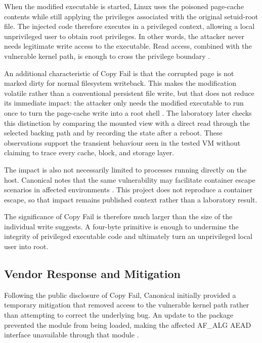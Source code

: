 When the modified executable is started, Linux uses the poisoned page-cache
contents while still applying the privileges associated with the original
setuid-root file. The injected code therefore executes in a privileged context,
allowing a local unprivileged user to obtain root privileges. In other words, the
attacker never needs legitimate write access to the executable. Read access,
combined with the vulnerable kernel path, is enough to cross the privilege
boundary \cite{copyfail-research}.

An additional characteristic of Copy Fail is that the corrupted page is not
marked dirty for normal filesystem writeback. This makes the modification
volatile rather than a conventional persistent file write, but that does not
reduce its immediate impact: the attacker only needs the modified executable to
run once to turn the page-cache write into a root shell
\cite{copyfail-research}. The laboratory later checks this distinction by
comparing the mounted view with a direct read through the selected backing path
and by recording the state after a reboot. These observations support the
transient behaviour seen in the tested VM without claiming to trace every cache,
block, and storage layer.

The impact is also not necessarily limited to processes running directly on the
host. Canonical notes that the same vulnerability may facilitate container
escape scenarios in affected environments \cite{ubuntu-copyfail-cve}. This
project does not reproduce a container escape, so that impact remains published
context rather than a laboratory result.

The significance of Copy Fail is therefore much larger than the size of the
individual write suggests. A four-byte primitive is enough to undermine the
integrity of privileged executable code and ultimately turn an unprivileged local
user into root.

\subsection{Vendor Response and Mitigation}

Following the public disclosure of Copy Fail, Canonical initially provided a
temporary mitigation that removed access to the vulnerable kernel path rather
than attempting to correct the underlying bug. An update to the 
package prevented the  module from being loaded, making the
affected AF\_ALG AEAD interface unavailable through that module
\cite{ubuntu-copyfail-fixes}.

